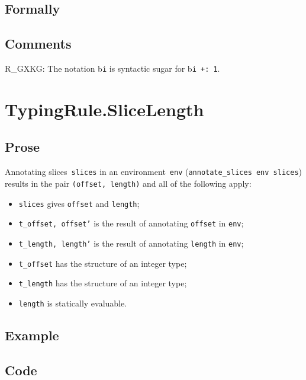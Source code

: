 \documentclass{book}
\begin{document}
\begin{emptyformal}
    \subsection{Formally}
\end{emptyformal}

\subsection{Comments}
    R\_GXKG: The notation b\texttt{i} is syntactic sugar for b\texttt{i +: 1}.

\section{TypingRule.SliceLength \label{sec:TypingRule.SliceLength}}

  \subsection{Prose}
   Annotating slices~\texttt{slices} in an environment~\texttt{env}
(\texttt{annotate\_slices env slices}) results in the pair \texttt{(offset,
length)} and all of the following apply:
   \begin{itemize}
   \item \texttt{slices} gives \texttt{offset} and \texttt{length};
   \item \texttt{t\_offset, offset'} is the result of annotating \texttt{offset} in \texttt{env};
   \item \texttt{t\_length, length'} is the result of annotating \texttt{length} in \texttt{env};
   \item \texttt{t\_offset} has the structure of an integer type;
   \item \texttt{t\_length} has the structure of an integer type;
   \item \texttt{length} is statically evaluable.
   \end{itemize}

  \subsection{Example}

  \subsection{Code}
\end{document}
